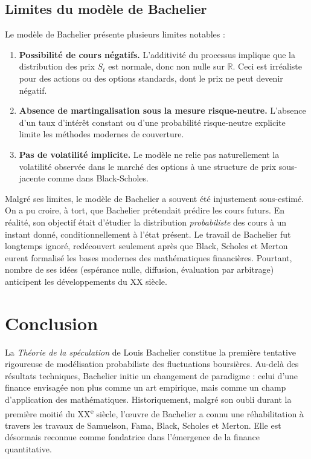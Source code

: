 \documentclass[12pt,a4paper]{article}
\begin{document}
\subsection{Limites du modèle de Bachelier}

Le modèle de Bachelier présente plusieurs limites notables :

\begin{enumerate}
    \item \textbf{Possibilité de cours négatifs.} L’additivité du processus implique que la distribution des prix $S_t$ est normale, donc non nulle sur $\mathbb{R}$. Ceci est irréaliste pour des actions ou des options standards, dont le prix ne peut devenir négatif.

    \item \textbf{Absence de martingalisation sous la mesure risque-neutre.} L’absence d’un taux d’intérêt constant ou d’une probabilité risque-neutre explicite limite les méthodes modernes de couverture.

    \item \textbf{Pas de volatilité implicite.} Le modèle ne relie pas naturellement la volatilité observée dans le marché des options à une structure de prix sous-jacente comme dans Black-Scholes.
\end{enumerate}

Malgré ses limites, le modèle de Bachelier a souvent été injustement sous-estimé. On a pu croire, à tort, que Bachelier prétendait prédire les cours futurs. En réalité, son objectif était d’étudier la distribution \textit{probabiliste} des cours à un instant donné, conditionnellement à l’état présent. Le travail de Bachelier fut longtemps ignoré, redécouvert seulement après que Black, Scholes et Merton eurent formalisé les bases modernes des mathématiques financières. Pourtant, nombre de ses idées (espérance nulle, diffusion, évaluation par arbitrage) anticipent les développements du XX siècle.

\section{Conclusion}
La \textit{Théorie de la spéculation} de Louis Bachelier constitue la première tentative rigoureuse de modélisation probabiliste des fluctuations boursières. Au-delà des résultats techniques, Bachelier initie un changement de paradigme : celui d’une finance envisagée non plus comme un art empirique, mais comme un champ d’application des mathématiques. Historiquement, malgré son oubli durant la première moitié du XX\textsuperscript{e} siècle, l’œuvre de Bachelier a connu une réhabilitation à travers les travaux de Samuelson, Fama, Black, Scholes et Merton. Elle est désormais reconnue comme fondatrice dans l’émergence de la finance quantitative.
\end{document}
